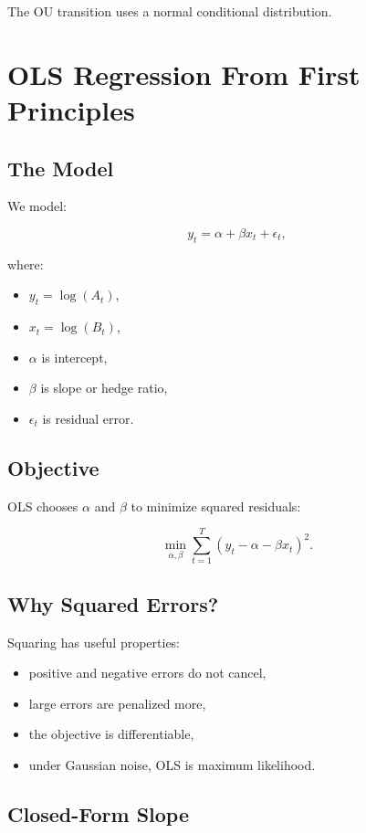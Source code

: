 \documentclass[11pt]{article}
\begin{document}
The OU transition uses a normal conditional distribution.

\section{OLS Regression From First Principles}

\subsection{The Model}

We model:

\[
y_t = \alpha + \beta x_t + \epsilon_t,
\]

where:

\begin{itemize}
  \item $y_t = \log(A_t)$,
  \item $x_t = \log(B_t)$,
  \item $\alpha$ is intercept,
  \item $\beta$ is slope or hedge ratio,
  \item $\epsilon_t$ is residual error.
\end{itemize}

\subsection{Objective}

OLS chooses $\alpha$ and $\beta$ to minimize squared residuals:

\[
\min_{\alpha,\beta}\sum_{t=1}^T
\left(y_t - \alpha - \beta x_t\right)^2.
\]

\subsection{Why Squared Errors?}

Squaring has useful properties:

\begin{itemize}
  \item positive and negative errors do not cancel,
  \item large errors are penalized more,
  \item the objective is differentiable,
  \item under Gaussian noise, OLS is maximum likelihood.
\end{itemize}

\subsection{Closed-Form Slope}
\end{document}
